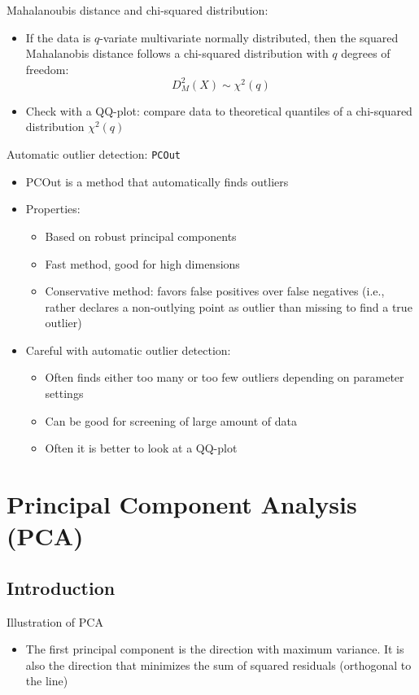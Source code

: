 \documentclass[a4paper]{article}
\begin{document}
Mahalanoubis distance and chi-squared distribution:
\begin{itemize}
    \item If the data is $q$-variate multivariate normally distributed, then the squared Mahalanobis distance follows a chi-squared distribution with $q$ degrees of freedom:
    \[D_M^2(X)\sim\chi^2(q) \]
    \item Check with a QQ-plot: compare data to theoretical quantiles of a chi-squared distribution $\chi^2(q)$
\end{itemize}

Automatic outlier detection: \texttt{PCOut}
\begin{itemize}
    \item PCOut is a method that automatically finds outliers
    \item Properties:
    \begin{itemize}
        \item Based on robust principal components
        \item Fast method, good for high dimensions
        \item Conservative method: favors false positives over false negatives (i.e., rather declares a non-outlying point as outlier than missing to find a true outlier)
    \end{itemize}
    \item Careful with automatic outlier detection:
    \begin{itemize}
        \item Often finds either too many or too few outliers depending on parameter settings
        \item Can be good for screening of large amount of data
        \item Often it is better to look at a QQ-plot
    \end{itemize}
\end{itemize}

\section{Principal Component Analysis (PCA)}

\subsection{Introduction}

Illustration of PCA
\begin{itemize}
    \item The first principal component is the direction with maximum variance. It is also the direction that minimizes the sum of squared residuals (orthogonal to the line)
\end{itemize}
\end{document}
